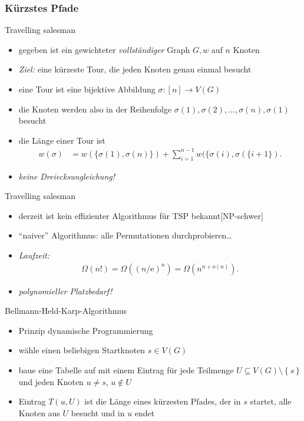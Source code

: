 \documentclass[aspectratio=1610, 11pt]{beamer}
\newcommand\eul{\mathrm e}
\newcommand\cbc[1]{\left\{{#1}\right\}}
\newcommand{\mytitle}{K\"urzstes Pfade}
\begin{document}
\begin{frame}\frametitle{\mytitle}
	\begin{overprint}
		\begin{exampleblock}{Travelling salesman}
			\begin{itemize}
				\item gegeben ist ein gewichteter \emph{vollst\"andiger} Graph $G,w$ auf $n$ Knoten
				\item \emph{Ziel:} eine k\"urzeste Tour, die jeden Knoten genau einmal besucht
				\item eine \alert{Tour} ist eine bijektive Abbildung $\sigma:[n]\to V(G)$
				\item die Knoten werden also in der Reihenfolge $\sigma(1),\sigma(2),\ldots,\sigma(n),\sigma(1)$ besucht
				\item die \alert{L\"ange} einer Tour ist
					\begin{align*}
						w(\sigma)&=w(\{\sigma(1),\sigma(n)\})+\sum_{i=1}^{n-1}w(\{\sigma(i),\sigma(\{i+1\}).
						\end{align*}
				\item \itshape keine Dreiecksungleichung!
			\end{itemize}
		\end{exampleblock}
		\begin{exampleblock}{Travelling salesman}
			\begin{itemize}
				\item 				derzeit ist kein effizienter Algorithmus f\"ur TSP bekannt\hfill[NP-schwer]
				\item ``naiver'' Algorithmus: alle Permutationen durchprobieren\dots
				\item \emph{Laufzeit:}
					\begin{align*}
						\Omega(n!)=\Omega((n/\eul)^n)=\Omega(n^{n+o(n)}).
					\end{align*}
				\item \itshape polynomieller Platzbedarf!
			\end{itemize}
		\end{exampleblock}
		\begin{exampleblock}{Bellmann-Held-Karp-Algorithmus}
			\begin{itemize}
				\item Prinzip dynamische Programmierung
				\item w\"ahle einen beliebigen Startknoten $s\in V(G)$
				\item baue eine \alert{Tabelle} auf mit einem Eintrag f\"ur jede Teilmenge $U\subseteq V(G)\setminus\cbc s$ und jeden Knoten $u\neq s$, $u\not\in U$ \item  Eintrag $T(u,U)$ ist die L\"ange eines k\"urzesten Pfades, der in $s$ startet, alle Knoten aus $U$ besucht und in $u$ endet

\end{itemize}
\end{exampleblock}
\end{overprint}
\end{frame}
\end{document}
